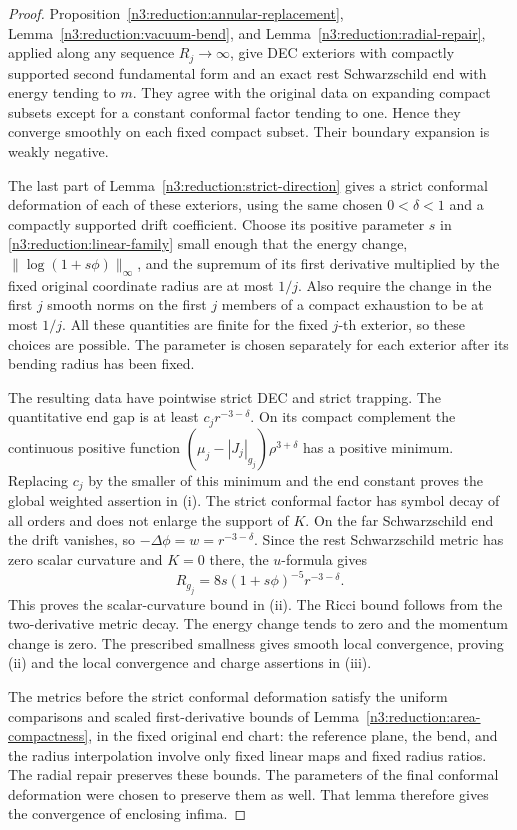 \begin{proof}
Proposition~\ref{n3:reduction:annular-replacement},
Lemma~\ref{n3:reduction:vacuum-bend}, and
Lemma~\ref{n3:reduction:radial-repair}, applied along any sequence
$R_j\to\infty$, give DEC exteriors with compactly supported second fundamental
form and an exact rest Schwarzschild end with energy tending to $m$.
They agree with the original data on expanding compact subsets except
for a constant conformal factor tending to one.  Hence they converge
smoothly on each fixed compact subset.  Their boundary expansion is
weakly negative.

The last part of Lemma~\ref{n3:reduction:strict-direction} gives a strict
conformal deformation of each of these exteriors, using the same chosen
$0<\delta<1$ and a compactly supported drift coefficient.  Choose its
positive parameter $s$ in \eqref{n3:reduction:linear-family}
small enough that the energy change, $\|\log(1+s\phi)\|_\infty$, and
the supremum of its first derivative multiplied by the fixed original
coordinate radius are at most $1/j$.  Also require the change in the
first $j$ smooth norms on the first $j$ members of a compact exhaustion
to be at most $1/j$.
All these quantities are finite for the fixed $j$-th exterior, so these
choices are possible. The parameter is chosen separately for each
exterior after its bending radius has been fixed.

The resulting data have pointwise strict DEC and strict trapping.
The quantitative end gap is at least $c_j r^{-3-\delta}$. On its compact
complement the continuous positive function
$(\mu_j-|J_j|_{g_j})\rho^{3+\delta}$ has a positive minimum.
Replacing $c_j$ by the smaller of this minimum and the end constant
proves the global weighted assertion in \textup{(i)}. The strict conformal factor has
symbol decay of all orders and does not enlarge the support of $K$.
On the far Schwarzschild end the drift vanishes, so
$-\Delta\phi=w=r^{-3-\delta}$. Since the rest Schwarzschild metric
has zero scalar curvature and $K=0$ there, the $u$-formula gives
\[
 R_{g_j}=8s(1+s\phi)^{-5}r^{-3-\delta}.
\]
This proves the scalar-curvature bound in \textup{(ii)}.
The Ricci bound follows from
the two-derivative metric decay. The energy change tends to zero and the
momentum change is zero. The prescribed smallness gives smooth local
convergence, proving \textup{(ii)} and the local convergence and charge
assertions in \textup{(iii)}.

The metrics before the strict conformal deformation satisfy the uniform
comparisons and
scaled first-derivative bounds of
Lemma~\ref{n3:reduction:area-compactness}, in the fixed original end chart:
the reference plane, the bend, and the radius interpolation involve only
fixed linear maps and fixed radius ratios.  The radial repair preserves
these bounds.  The parameters of the final conformal deformation were chosen to
preserve them as well.  That lemma therefore gives the convergence of
enclosing infima.

\end{proof}

